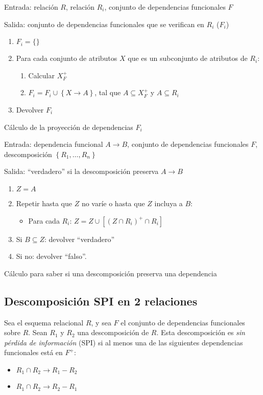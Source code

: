 \documentclass[a4paper, twoside]{article}
\begin{document}
\begin{algorithm}[H]
	Entrada: relación $R$, relación $R_{i}$, conjunto de dependencias funcionales $F$

	Salida: conjunto de dependencias funcionales que se verifican en $R_{i}$ ($F_{i}$)
	\begin{enumerate}
		\item $F_{i}=\{\}$
		\item Para cada conjunto de atributos $X$ que es un subconjunto de atributos de $R_{i}$:
		\begin{enumerate}
			\item Calcular $X_{F}^{+}$
			\item $F_{i}=F_{i}\cup\left\{ X\to A\right\} $, tal que $A\subseteq X_{F}^{+}$ y $A\subseteq R_{i}$
		\end{enumerate}
		\item Devolver $F_{i}$
	\end{enumerate}
	\caption{Cálculo de la proyección de dependencias $F_{i}$}
\end{algorithm}

\begin{algorithm}[H]
	Entrada: dependencia funcional $A\to B$, conjunto de dependencias funcionales $F$, descomposición $\left\{ R_{1},\ldots,R_{n}\right\}$

	Salida: ``verdadero'' si la descomposición preserva $A\to B$
	\begin{enumerate}
		\item $Z=A$
		\item Repetir hasta que $Z$ no varíe o hasta que $Z$ incluya a $B$:
		\begin{itemize}
			\item Para cada $R_{i}$: $Z=Z\cup\left[\left(Z\cap R_{i}\right)^{+}\cap R_{i}\right]$
		\end{itemize}
		\item Si $B\subseteq Z$: devolver ``verdadero''
		\item Si no: devolver ``falso''.
	\end{enumerate}
	\caption{Cálculo para saber si una descomposición preserva una dependencia}
\end{algorithm}

\subsection{Descomposición SPI en 2 relaciones}
Sea el esquema relacional $R$, y sea $F$ el conjunto de dependencias funcionales sobre $R$. Sean $R_{1}$ y $R_{2}$ una descomposición de $R$. Esta descomposición es \emph{sin pérdida de información} (SPI) si al menos una de las siguientes dependencias funcionales está en $F^{+}$:
\begin{itemize}
	\item $R_{1}\cap R_{2}\to R_{1}-R_{2}$
	\item $R_{1}\cap R_{2}\to R_{2}-R_{1}$
\end{itemize}
\end{document}
